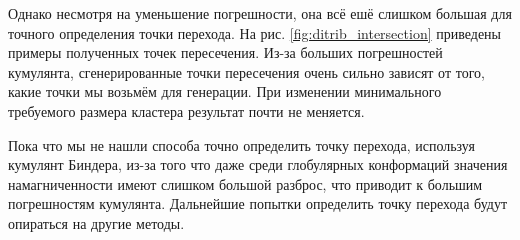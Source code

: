 Однако несмотря на уменьшение погрешности, она всё ешё слишком большая для точного определения точки перехода. На рис. \ref*{fig:ditrib_intersection} приведены примеры полученных точек пересечения. Из-за больших погрешностей кумулянта, сгенерированные точки пересечения очень сильно зависят от того, какие точки мы возьмём для генерации. При изменении минимального требуемого размера кластера результат почти не меняется. 

Пока что мы не нашли способа точно определить точку перехода, используя кумулянт Биндера, из-за того что даже среди глобулярных конформаций значения намагниченности имеют слишком большой разброс, что приводит к большим погрешностям кумулянта. Дальнейшие попытки определить точку перехода будут опираться на другие методы.